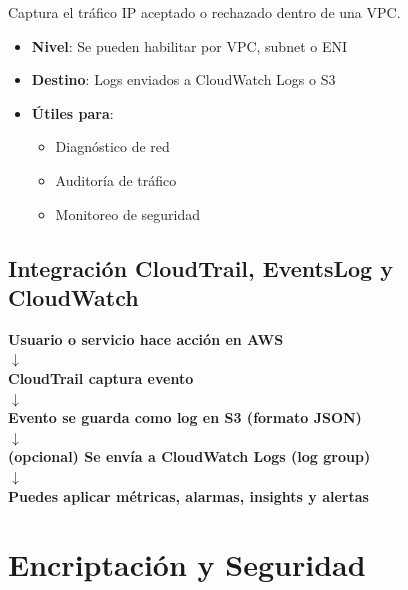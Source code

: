 \documentclass[12pt,a4paper]{report}
\begin{document}
\begin{conceptbox}
Captura el tráfico IP aceptado o rechazado dentro de una VPC.
\end{conceptbox}

\begin{itemize}
    \item \textbf{Nivel}: Se pueden habilitar por VPC, subnet o ENI
    \item \textbf{Destino}: Logs enviados a CloudWatch Logs o S3
    \item \textbf{Útiles para}:
    \begin{itemize}
        \item Diagnóstico de red
        \item Auditoría de tráfico
        \item Monitoreo de seguridad
    \end{itemize}
\end{itemize}

\section{Integración CloudTrail, EventsLog y CloudWatch}

\begin{center}
\begin{tcolorbox}[width=0.9\textwidth, colback=lightgray!50, colframe=awsblue, title=Flujo de Integración]
\centering
\textbf{Usuario o servicio hace acción en AWS}
\\[0.5cm]
$\downarrow$
\\[0.5cm]
\textbf{CloudTrail captura evento}
\\[0.5cm]
$\downarrow$
\\[0.5cm]
\textbf{Evento se guarda como log en S3 (formato JSON)}
\\[0.5cm]
$\downarrow$
\\[0.5cm]
\textbf{(opcional) Se envía a CloudWatch Logs (log group)}
\\[0.5cm]
$\downarrow$
\\[0.5cm]
\textbf{Puedes aplicar métricas, alarmas, insights y alertas}
\end{tcolorbox}
\end{center}

\newpage

\chapter{Encriptación y Seguridad}
\end{document}
